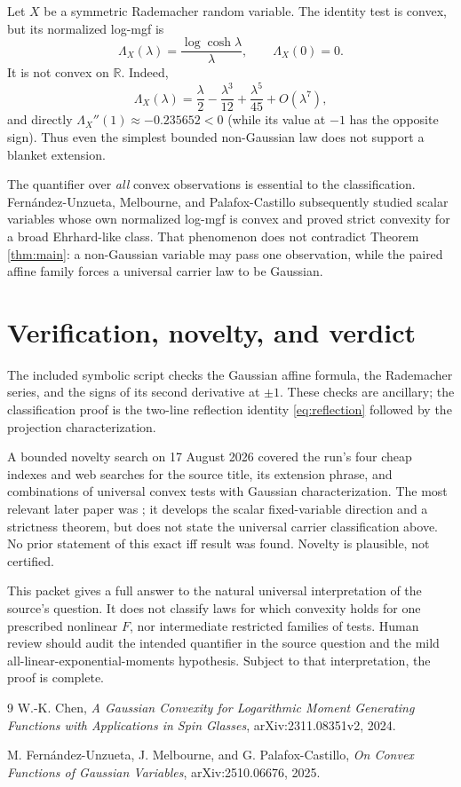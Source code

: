 \documentclass[10pt]{article}
\newcommand{\R}{\mathbb R}
\begin{document}
Let $X$ be a symmetric Rademacher random variable.  The identity test is
convex, but its normalized log-mgf is
\[
             \Lambda_X(\lambda)=\frac{\log\cosh\lambda}{\lambda},
             \qquad \Lambda_X(0)=0.
\]
It is not convex on $\R$.  Indeed,
\[
 \Lambda_X(\lambda)=\frac\lambda2-\frac{\lambda^3}{12}
                     +\frac{\lambda^5}{45}+O(\lambda^7),
\]
and directly $\Lambda_X''(1)\approx-0.235652<0$ (while its value at $-1$
has the opposite sign).  Thus even the simplest bounded non-Gaussian law
does not support a blanket extension.

The quantifier over \emph{all} convex observations is essential to the
classification.  Fern\'andez-Unzueta, Melbourne, and Palafox-Castillo
\cite{FMP} subsequently studied scalar variables whose own normalized
log-mgf is convex and proved strict convexity for a broad Ehrhard-like class.
That phenomenon does not contradict Theorem \ref{thm:main}: a non-Gaussian
variable may pass one observation, while the paired affine family forces a
universal carrier law to be Gaussian.

\section{Verification, novelty, and verdict}

The included symbolic script checks the Gaussian affine formula, the
Rademacher series, and the signs of its second derivative at $\pm1$.  These
checks are ancillary; the classification proof is the two-line reflection
identity \eqref{eq:reflection} followed by the projection characterization.

A bounded novelty search on 17 August 2026 covered the run's four cheap
indexes and web searches for the source title, its extension phrase, and
combinations of universal convex tests with Gaussian characterization.  The
most relevant later paper was \cite{FMP}; it develops the scalar
fixed-variable direction and a strictness theorem, but does not state the
universal carrier classification above.  No prior statement of this exact
iff result was found.  Novelty is plausible, not certified.

This packet gives a full answer to the natural universal interpretation of
the source's question.  It does not classify laws for which convexity holds
for one prescribed nonlinear $F$, nor intermediate restricted families of
tests.  Human review should audit the intended quantifier in the source
question and the mild all-linear-exponential-moments hypothesis.  Subject to
that interpretation, the proof is complete.

\begin{thebibliography}{9}
W.-K. Chen,
\emph{A Gaussian Convexity for Logarithmic Moment Generating Functions with
Applications in Spin Glasses}, arXiv:2311.08351v2, 2024.

M. Fern\'andez-Unzueta, J. Melbourne, and G. Palafox-Castillo,
\emph{On Convex Functions of Gaussian Variables}, arXiv:2510.06676, 2025.
\end{thebibliography}
\end{document}
